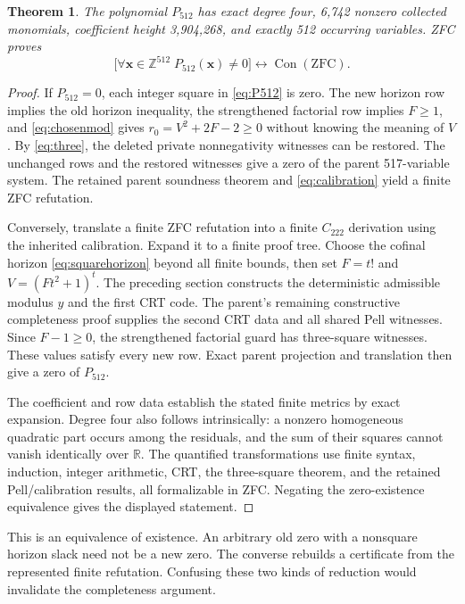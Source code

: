 \documentclass[11pt]{article}
\newcommand{\Z}{\mathbb Z}\newcommand{\N}{\mathbb N}
\newcommand{\Con}{\operatorname{Con}}\newcommand{\ZFC}{\mathrm{ZFC}}
\newcommand{\Ccal}{C_{222}}\newcommand{\htop}{\operatorname{ht}}
\newtheorem{theorem}{Theorem}[section]
\theoremstyle{definition}\newtheorem{definition}[theorem]{Definition}
\theoremstyle{remark}\newtheorem{remark}[theorem]{Remark}
\begin{document}
\begin{theorem}
The polynomial $P_{512}$ has exact degree four, 6,742 nonzero collected
monomials, coefficient height 3,904,268, and exactly 512 occurring variables.
ZFC proves
\[
 \bigl[\forall\mathbf x\in\Z^{512}\;P_{512}(\mathbf x)\ne0\bigr]
 \longleftrightarrow\Con(\ZFC).
\]
\end{theorem}
\begin{proof}
If $P_{512}=0$, each integer square in \eqref{eq:P512} is zero. The
new horizon row implies the old horizon inequality, the strengthened
factorial row implies $F\ge1$, and \eqref{eq:chosenmod} gives
$r_0=V^2+2F-2\ge0$ without knowing the meaning of $V$. By
\eqref{eq:three}, the deleted private nonnegativity witnesses can be
restored. The unchanged rows and the restored witnesses give a zero of the
parent 517-variable system. The retained parent soundness theorem and
\eqref{eq:calibration} yield a finite ZFC refutation.

Conversely, translate a finite ZFC refutation into a finite $\Ccal$
derivation using the inherited calibration. Expand it to a finite proof tree.
Choose the cofinal horizon \eqref{eq:squarehorizon} beyond all finite bounds,
then set $F=t!$ and $V=(Ft^2+1)^t$. The preceding section constructs the
deterministic admissible modulus $y$ and the first CRT code. The parent's
remaining constructive completeness proof supplies the second CRT data and
all shared Pell witnesses. Since $F-1\ge0$, the strengthened factorial
guard has three-square witnesses. These values satisfy every new row. Exact
parent projection and translation then give a zero of $P_{512}$.

The coefficient and row data establish the stated finite metrics by exact
expansion. Degree four also follows intrinsically: a nonzero homogeneous
quadratic part occurs among the residuals, and the sum of their squares
cannot vanish identically over $\mathbb R$. The quantified transformations
use finite syntax, induction, integer arithmetic, CRT, the three-square
theorem, and the retained Pell/calibration results, all formalizable in ZFC.
Negating the zero-existence equivalence gives the displayed statement.
\end{proof}

This is an equivalence of existence. An arbitrary old zero with a nonsquare
horizon slack need not be a new zero. The converse rebuilds a certificate
from the represented finite refutation. Confusing these two kinds of
reduction would invalidate the completeness argument.
\end{document}
